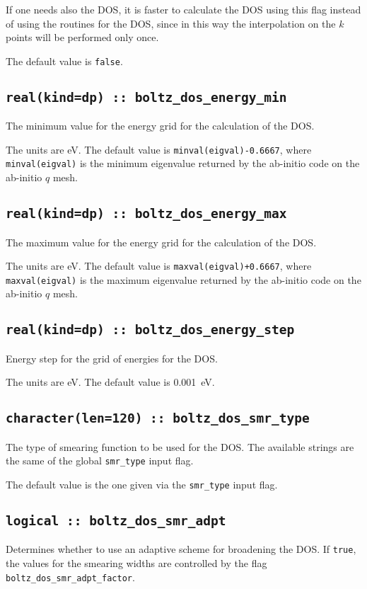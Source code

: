 If one needs also the DOS, it is faster to calculate the DOS using this flag instead of using the routines for the DOS, since in this way the interpolation on the $k$ points will be performed only once.

The default value is \verb#false#.

\subsection[boltz\_dos\_energy\_min]{\tt real(kind=dp) :: boltz\_dos\_energy\_min}
The minimum value for the energy grid for the calculation of the DOS.

The units are eV.
The default value is {\tt minval(eigval)-0.6667}, where  {\tt minval(eigval)} is the minimum eigenvalue returned by the ab-initio code on the ab-initio $q$ mesh.

\subsection[boltz\_dos\_energy\_max]{\tt real(kind=dp) :: boltz\_dos\_energy\_max}
The maximum value for the energy grid for the calculation of the DOS.

The units are eV.
The default value is {\tt maxval(eigval)+0.6667}, where  {\tt maxval(eigval)} is the maximum eigenvalue returned by the ab-initio code on the ab-initio $q$ mesh.

\subsection[boltz\_dos\_energy\_step]{\tt real(kind=dp) :: boltz\_dos\_energy\_step}
Energy step for the grid of energies for the DOS.

The units are eV.
The default value is 0.001~eV.

\subsection[boltz\_dos\_smr\_type]{\tt character(len=120) :: boltz\_dos\_smr\_type}
The type of smearing function to be used for the DOS. The available strings are the same of the global {\tt smr\_type} input flag. 

The default value is the one given via the {\tt smr\_type} input flag. 


\subsection[boltz\_dos\_smr\_adpt]{\tt logical :: boltz\_dos\_smr\_adpt}
Determines whether to use an adaptive scheme for broadening the
DOS. If \verb#true#, the values for the smearing widths are 
controlled by the flag {\tt boltz\_dos\_smr\_adpt\_factor}.

